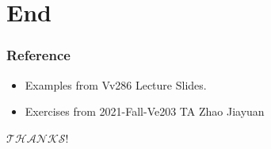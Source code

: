 \documentclass{beamer}
\begin{document}
\section{End}

\begin{frame}
    \frametitle{Reference}

    \begin{itemize}
        \item Examples from Vv286 Lecture Slides.
        \item Exercises from 2021-Fall-Ve203 TA Zhao Jiayuan
    \end{itemize}

\end{frame}

\begin{frame}
    \centering
    \Huge{$\mathcal{THANKS}$!}
\end{frame}
\end{document}
